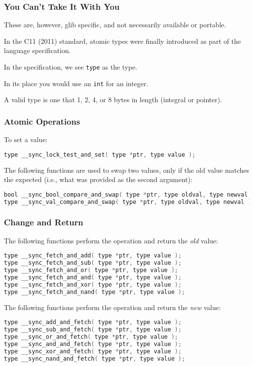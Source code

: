 \begin{frame}
	\frametitle{You Can't Take It With You}
	
	These are, however, glib specific, and not necessarily available or portable.
	
	In the C11 (2011) standard, atomic types were finally introduced as part of the language specification. 
	
	In the specification, we see \texttt{type} as the type.
	
	In its place you would use an \texttt{int} for an integer. 
	
	A valid type is one that 1, 2, 4, or 8 bytes in length (integral or pointer).

\end{frame}


\begin{frame}[fragile]
	\frametitle{Atomic Operations}

To set a value:
\begin{lstlisting}[language=C]
type __sync_lock_test_and_set( type *ptr, type value );
\end{lstlisting}


The following functions are used to swap two values, only if the old value matches the expected (i.e., what was provided as the second argument):

\begin{lstlisting}[language=C]
bool __sync_bool_compare_and_swap( type *ptr, type oldval, type newval );
type __sync_val_compare_and_swap( type *ptr, type oldval, type newval );
\end{lstlisting}


\end{frame}


\begin{frame}[fragile]
\frametitle{Change and Return}

The following functions perform the operation and return the \textit{old} value:
\begin{lstlisting}[language=C]
type __sync_fetch_and_add( type *ptr, type value );
type __sync_fetch_and_sub( type *ptr, type value );
type __sync_fetch_and_or( type *ptr, type value );
type __sync_fetch_and_and( type *ptr, type value );
type __sync_fetch_and_xor( type *ptr, type value );
type __sync_fetch_and_nand( type *ptr, type value );
\end{lstlisting}

The following functions perform the operation and return the \textit{new} value:
\begin{lstlisting}[language=C]
type __sync_add_and_fetch( type *ptr, type value );
type __sync_sub_and_fetch( type *ptr, type value );
type __sync_or_and_fetch( type *ptr, type value );
type __sync_and_and_fetch( type *ptr, type value );
type __sync_xor_and_fetch( type *ptr, type value );
type __sync_nand_and_fetch( type *ptr, type value );
\end{lstlisting}


\end{frame}


